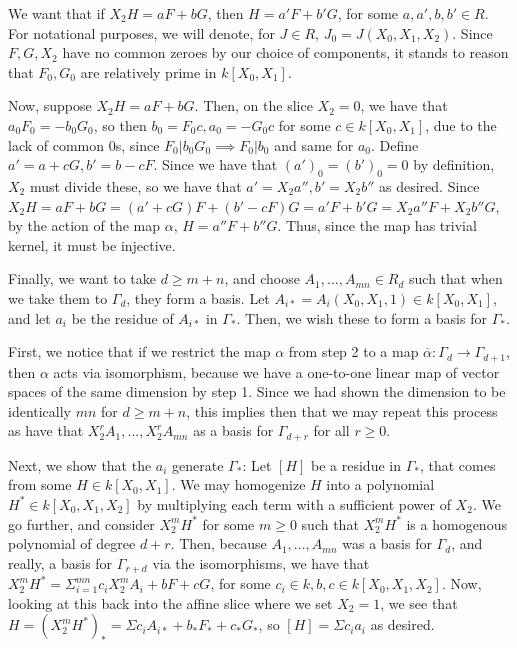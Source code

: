 \documentclass[10pt]{article}
\begin{document}
We want that if $X_2 H = aF + bG$, then $H = a'F + b'G$, for some $a,a',b,b' \in R$. For notational purposes, we will denote, for $J \in R$, $J_0 = J(X_0, X_1, X_2)$. Since $F,G, X_2$ have no common zeroes by our choice of components, it stands to reason that $F_0, G_0$ are relatively prime in $k[X_0,X_1]$.

Now, suppose $X_2 H = aF + bG$. Then, on the slice $X_2 = 0$, we have that $a_0F_0 = - b_0 G_0$, so then $b_0 = F_0c, a_0 = -G_0c$ for some $c \in k[X_0,X_1]$, due to the lack of common 0s, since $F_0 | b_0 G_0 \implies F_0 | b_0$ and same for $a_0$. Define $a' = a  +cG, b' = b - cF$. Since we have that $(a')_0 = (b')_0 = 0$ by definition, $X_2$ must divide these, so we have that $a' = X_2 a'', b' = X_2 b''$ as desired. Since $X_2 H = aF + bG = (a'+cG)F + (b'-cF)G = a'F + b'G = X_2 a''F + X_2 b''G$, by the action of the map $\alpha$, $H = a''F + b''G$. Thus, since the map has trivial kernel, it must be injective.

Finally, we want to take $d \geq m + n$, and choose $A_1,...,A_{mn} \in R_d$ such that when we take them to $\Gamma_d$, they form a basis. Let $A_{i*} = A_i(X_0,X_1,1) \in k[X_0,X_1]$, and let $a_i$ be the residue of $A_{i*}$ in $\Gamma_*$. Then, we wish these to form a basis for $\Gamma_*$.

First, we notice that if we restrict the map $\alpha$ from step 2 to a map $\overline{\alpha}: \Gamma_d \to \Gamma_{d+1}$, then $\alpha$ acts via isomorphism, because we have a one-to-one linear map of vector spaces of the same dimension by step 1. Since we had shown the dimension to be identically $mn$ for $d \geq m +n$, this implies then that we may repeat this process as have that $X_2^r A_1,...,X_2^r A_{mn}$ as a basis for  $\Gamma_{d+r}$ for all $r \geq 0$.

Next, we show that the $a_i$ generate $\Gamma_*$: Let $[H]$ be a residue in $\Gamma_*$, that comes from some $H \in k[X_0,X_1]$. We may homogenize $H$ into a polynomial $H^* \in k[X_0,X_1,X_2]$ by multiplying each term with a sufficient power of $X_2$. We go further, and consider $X_2^m H^*$ for some $m \geq 0$ such that $X_2^m H^*$ is a homogenous polynomial of degree $d + r$. Then, because $A_1,... ,A_{mn}$ was a basis for $\Gamma_d$, and really, a basis for $\Gamma_{r + d}$ via the isomorphisms, we have that $X_2^m H^* = \Sigma_{i=1}^{mn} c_i X_2^m A_i + bF + cG$, for some $c_i \in k, b,c \in k[X_0,X_1,X_2]$. Now, looking at this back into the affine slice where we set $X_2 = 1$, we see that $H = (X_2^m H^*)_* = \Sigma c_i A_{i*} + b_* F_* + c_* G_*$, so $[H] = \Sigma c_i a_i$ as desired. 
\end{document}
